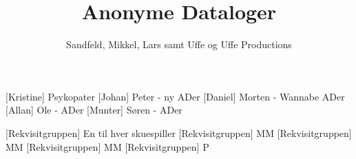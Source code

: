 \documentclass[a4paper,11pt]{article}
\title{Anonyme Dataloger}
\author{Sandfeld, Mikkel, Lars samt Uffe og Uffe Productions\texttrademark}
\begin{document}
\maketitle

\begin{roles}
[Kristine]  Psykopater
[Johan] Peter - ny ADer
[Daniel] Morten - Wannabe ADer
[Allan] Ole - ADer
[Munter] Søren - ADer
\end{roles}

\begin{props}
[Rekvisitgruppen] En til hver skuespiller
[Rekvisitgruppen] MM
[Rekvisitgruppen] MM
[Rekvisitgruppen] MM
[Rekvisitgruppen] P
\end{props}
\end{document}
